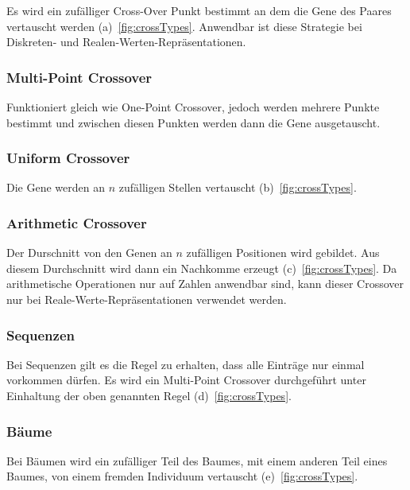         Es wird ein zufälliger Cross-Over Punkt bestimmt an dem die Gene des Paares vertauscht werden (a)~\vref{fig:crossTypes}.
        Anwendbar ist diese Strategie bei Diskreten- und Realen-Werten-Repräsentationen.

      \subsubsection{Multi-Point Crossover}

        Funktioniert gleich wie One-Point Crossover, jedoch werden mehrere Punkte bestimmt und
        zwischen diesen Punkten werden dann die Gene ausgetauscht.

      \subsubsection{Uniform Crossover}

        Die Gene werden an \(n\) zufälligen Stellen vertauscht (b)~\vref{fig:crossTypes}.

      \subsubsection{Arithmetic Crossover}

        Der Durschnitt von den Genen an \(n\) zufälligen Positionen wird gebildet.
        Aus diesem Durchschnitt wird dann ein Nachkomme erzeugt (c)~\vref{fig:crossTypes}.
        Da arithmetische Operationen nur auf Zahlen anwendbar sind,
        kann dieser Crossover nur bei Reale-Werte-Repräsentationen verwendet werden.

      \subsubsection{Sequenzen}

        Bei Sequenzen gilt es die Regel zu erhalten, dass alle Einträge nur einmal vorkommen dürfen.
        Es wird ein Multi-Point Crossover durchgeführt unter Einhaltung der oben genannten Regel (d)~\vref{fig:crossTypes}.

      \subsubsection{Bäume}

        Bei Bäumen wird ein zufälliger Teil des Baumes, mit einem anderen Teil eines Baumes, von einem fremden Individuum vertauscht (e)~\vref{fig:crossTypes}.

